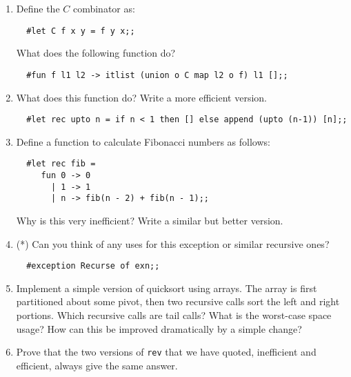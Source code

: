 \begin{enumerate}

\item Define the $C$ combinator as:

\begin{boxed}\begin{verbatim}
  #let C f x y = f y x;;
\end{verbatim}\end{boxed}

What does the following function do?

\begin{boxed}\begin{verbatim}
  #fun f l1 l2 -> itlist (union o C map l2 o f) l1 [];;
\end{verbatim}\end{boxed}

\item What does this function do? Write a more efficient version.

\begin{boxed}\begin{verbatim}
  #let rec upto n = if n < 1 then [] else append (upto (n-1)) [n];;
\end{verbatim}\end{boxed}

\item Define a function to calculate Fibonacci numbers as follows:

\begin{boxed}\begin{verbatim}
  #let rec fib =
     fun 0 -> 0
       | 1 -> 1
       | n -> fib(n - 2) + fib(n - 1);;
\end{verbatim}\end{boxed}

Why is this very inefficient? Write a similar but better version.

\item (*) Can you think of any uses for this exception or similar recursive
ones?

\begin{boxed}\begin{verbatim}
  #exception Recurse of exn;;
\end{verbatim}\end{boxed}

\item Implement a simple version of quicksort using arrays. The array is first
partitioned about some pivot, then two recursive calls sort the left and right
portions. Which recursive calls are tail calls? What is the worst-case space
usage? How can this be improved dramatically by a simple change?

\item Prove that the two versions of {\tt rev} that we have quoted, inefficient
and efficient, always give the same answer.

\end{enumerate}

